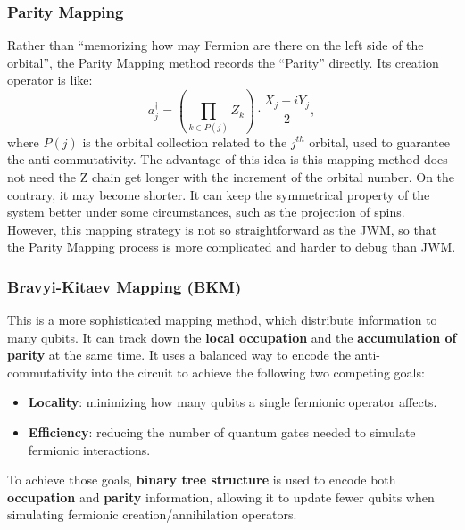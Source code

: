 \subsubsection{Parity Mapping}
Rather than ``memorizing how may Fermion are there on the left side of the orbital'', the Parity Mapping method records the ``Parity'' directly. Its creation operator is like:
\begin{equation}
    a^\dagger_j=\left(\prod_{k\in P(j)}Z_k\right)\cdot\frac{X_j-iY_j}{2},
\end{equation}
where $P(j)$ is the orbital collection related to the $j^{th}$ orbital, used to guarantee the anti-commutativity. The advantage of this idea is this mapping method does not need the Z chain get longer with the increment of the orbital number. On the contrary, it may become shorter. It can keep the symmetrical property of the system better under some circumstances, such as the projection of spins. However, this mapping strategy is not so straightforward as the JWM, so that the Parity Mapping process is more complicated and harder to debug than JWM.  

\subsubsection{Bravyi-Kitaev Mapping (BKM)}
This is a more sophisticated mapping method, which distribute information to many qubits. It can track down the \textbf{local occupation} and the \textbf{accumulation of parity} at the same time. It uses a balanced way to encode the anti-commutativity into the circuit to achieve the following two competing goals:
\begin{itemize}
    \item \textbf{Locality}: minimizing how many qubits a single fermionic operator affects.
    \item \textbf{Efficiency}: reducing the number of quantum gates needed to simulate fermionic interactions.
\end{itemize}
To achieve those goals, \textbf{binary tree structure} is used to encode both \textbf{occupation} and \textbf{parity} information, allowing it to update fewer qubits when simulating fermionic creation/annihilation operators.

